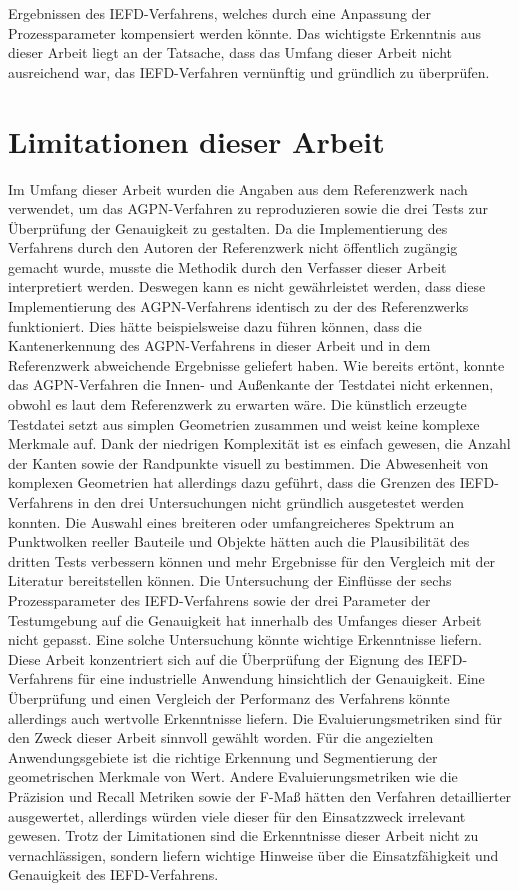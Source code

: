 Ergebnissen des IEFD-Verfahrens, welches durch eine Anpassung der Prozessparameter kompensiert werden könnte. Das wichtigste Erkenntnis aus dieser Arbeit liegt an der Tatsache, dass das Umfang dieser Arbeit nicht ausreichend war, das IEFD-Verfahren vernünftig und gründlich zu überprüfen.

\section{Limitationen dieser Arbeit}
Im Umfang dieser Arbeit wurden die Angaben aus dem Referenzwerk nach \textcite{ni_edge_2016} verwendet, um das AGPN-Verfahren zu reproduzieren sowie die drei Tests zur Überprüfung der Genauigkeit zu gestalten. Da die Implementierung des Verfahrens durch den Autoren der Referenzwerk nicht öffentlich zugängig gemacht wurde, musste die Methodik durch den Verfasser dieser Arbeit interpretiert werden. Deswegen kann es nicht gewährleistet werden, dass diese Implementierung des AGPN-Verfahrens identisch zu der des Referenzwerks funktioniert. Dies hätte beispielsweise dazu führen können, dass die Kantenerkennung des AGPN-Verfahrens in dieser Arbeit und in dem Referenzwerk abweichende Ergebnisse geliefert haben. Wie bereits ertönt, konnte das AGPN-Verfahren die Innen- und Außenkante der Testdatei nicht erkennen, obwohl es laut dem Referenzwerk zu erwarten wäre. Die künstlich erzeugte Testdatei setzt aus simplen Geometrien zusammen und weist keine komplexe Merkmale auf. Dank der niedrigen Komplexität ist es einfach gewesen, die Anzahl der Kanten sowie der Randpunkte visuell zu bestimmen. Die Abwesenheit von komplexen Geometrien hat allerdings dazu geführt, dass die Grenzen des IEFD-Verfahrens in den drei Untersuchungen nicht gründlich ausgetestet werden konnten. Die Auswahl eines breiteren oder umfangreicheres Spektrum an Punktwolken reeller Bauteile und Objekte hätten auch die Plausibilität des dritten Tests verbessern können und mehr Ergebnisse für den Vergleich mit der Literatur bereitstellen können. Die Untersuchung der Einflüsse der sechs Prozessparameter des IEFD-Verfahrens sowie der drei Parameter der Testumgebung auf die Genauigkeit hat innerhalb des Umfanges dieser Arbeit nicht gepasst. Eine solche Untersuchung könnte wichtige Erkenntnisse liefern. Diese Arbeit konzentriert sich auf die Überprüfung der Eignung des IEFD-Verfahrens für eine industrielle Anwendung hinsichtlich der Genauigkeit. Eine Überprüfung und einen Vergleich der Performanz des Verfahrens könnte allerdings auch wertvolle Erkenntnisse liefern. Die Evaluierungsmetriken sind für den Zweck dieser Arbeit sinnvoll gewählt worden. Für die angezielten Anwendungsgebiete ist die richtige Erkennung und Segmentierung der geometrischen Merkmale von Wert. Andere Evaluierungsmetriken wie die Präzision und Recall Metriken sowie der F-Maß hätten den Verfahren detaillierter ausgewertet, allerdings würden viele dieser für den Einsatzzweck irrelevant gewesen. Trotz der Limitationen sind die Erkenntnisse dieser Arbeit nicht zu vernachlässigen, sondern liefern wichtige Hinweise über die Einsatzfähigkeit und Genauigkeit des IEFD-Verfahrens.


